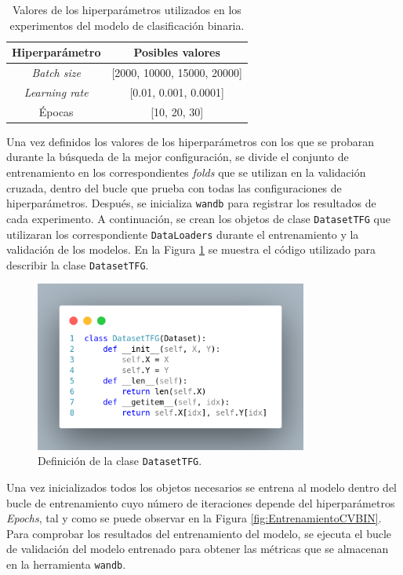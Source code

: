 \begin{table}[H]
\centering
\begin{tabular}{|c|c|}
\hline
\textbf{Hiperparámetro} & \textbf{Posibles valores} \\ \hline
\textit{Batch size} & [2000, 10000, 15000, 20000] \\ \hline
\textit{Learning rate} & [0.01, 0.001, 0.0001] \\ \hline
Épocas & [10, 20, 30] \\ \hline
\end{tabular}
\caption{Valores de los hiperparámetros utilizados en los experimentos del modelo de clasificación binaria.}
\label{tab:hiperBIN}
\end{table}

Una vez definidos los valores de los hiperparámetros con los que se probaran durante la búsqueda de la mejor configuración, se divide el conjunto de entrenamiento en los correspondientes \textit{folds} que se utilizan en la validación cruzada, dentro del bucle que prueba con todas las configuraciones de hiperparámetros. Después, se inicializa \texttt{wandb} para registrar los resultados de cada experimento. A continuación, se crean los objetos de clase \texttt{DatasetTFG} que utilizaran los correspondiente \texttt{DataLoaders}  durante el entrenamiento y la validación de los modelos. En la Figura \ref{fig:DatasetTFG} se muestra el código utilizado para describir la clase \texttt{DatasetTFG}. 


\begin{figure}[H]
    \centering
    \includegraphics[width=0.8\textwidth]{./img/modelo/codigo/DatasetTFG.png}
    \caption{Definición de la clase \texttt{DatasetTFG}.}
    \label{fig:DatasetTFG}
\end{figure}

Una vez inicializados todos los objetos necesarios se entrena al modelo dentro del bucle de entrenamiento cuyo número de iteraciones depende del hiperparámetros \textit{Epochs}, tal y como se puede observar en la Figura \ref{fig:EntrenamientoCVBIN}. Para comprobar los resultados del entrenamiento del modelo, se ejecuta el bucle de validación del modelo entrenado para obtener las métricas que se almacenan en la herramienta \texttt{wandb}.



